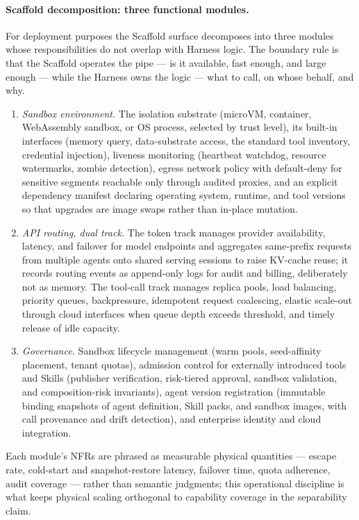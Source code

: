 \paragraph{Scaffold decomposition: three functional modules.}
For deployment purposes the Scaffold surface decomposes into three modules whose responsibilities do not overlap with Harness logic. The boundary rule is that the Scaffold operates the pipe --- is it available, fast enough, and large enough --- while the Harness owns the logic --- what to call, on whose behalf, and why.
\begin{enumerate}
\item \textit{Sandbox environment.} The isolation substrate (microVM, container, WebAssembly sandbox, or OS process, selected by trust level), its built-in interfaces (memory query, data-substrate access, the standard tool inventory, credential injection), liveness monitoring (heartbeat watchdog, resource watermarks, zombie detection), egress network policy with default-deny for sensitive segments reachable only through audited proxies, and an explicit dependency manifest declaring operating system, runtime, and tool versions so that upgrades are image swaps rather than in-place mutation.
\item \textit{API routing, dual track.} The token track manages provider availability, latency, and failover for model endpoints and aggregates same-prefix requests from multiple agents onto shared serving sessions to raise KV-cache reuse; it records routing events as append-only logs for audit and billing, deliberately not as memory. The tool-call track manages replica pools, load balancing, priority queues, backpressure, idempotent request coalescing, elastic scale-out through cloud interfaces when queue depth exceeds threshold, and timely release of idle capacity.
\item \textit{Governance.} Sandbox lifecycle management (warm pools, seed-affinity placement, tenant quotas), admission control for externally introduced tools and Skills (publisher verification, risk-tiered approval, sandbox validation, and composition-risk invariants), agent version registration (immutable binding snapshots of agent definition, Skill packs, and sandbox images, with call provenance and drift detection), and enterprise identity and cloud integration.
\end{enumerate}
Each module's NFRs are phrased as measurable physical quantities --- escape rate, cold-start and snapshot-restore latency, failover time, quota adherence, audit coverage --- rather than semantic judgments; this operational discipline is what keeps physical scaling orthogonal to capability coverage in the separability claim.

